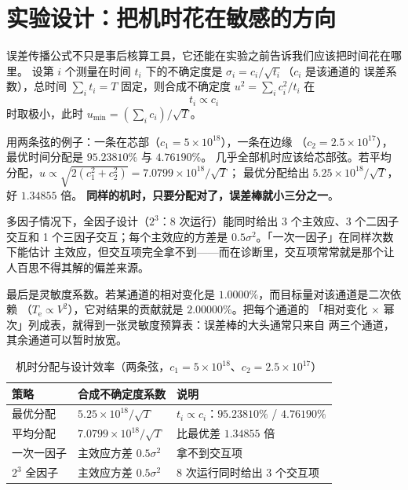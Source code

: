 \section{实验设计：把机时花在敏感的方向}
\label{sec:app-au-design}

误差传播公式不只是事后核算工具，它还能在实验之前告诉我们应该把时间花在哪里。
设第 $i$ 个测量在时间 $t_i$ 下的不确定度是 $\sigma_i=c_i/\sqrt{t_i}$（$c_i$ 是该通道的
误差系数），总时间 $\sum_i t_i=T$ 固定，则合成不确定度
$u^2=\sum_i c_i^2/t_i$ 在
\begin{equation}
t_i\propto c_i
\label{eq:app-au-alloc}
\end{equation}
时取极小，此时 $u_\mathrm{min}=(\sum_i c_i)/\sqrt{T}$。

用两条弦的例子：一条在芯部（$c_1=5\times10^{18}$），一条在边缘
（$c_2=2.5\times10^{17}$），最优时间分配是 $95.23810\%$ 与 $4.76190\%$。
几乎全部机时应该给芯部弦。若平均分配，$u\propto\sqrt{2(c_1^2+c_2^2)}=7.0799\times10^{18}/\sqrt{T}$；
最优分配给出 $5.25\times10^{18}/\sqrt{T}$，好 $1.34855$ 倍。
\textbf{同样的机时，只要分配对了，误差棒就小三分之一}。

多因子情况下，全因子设计（$2^3$：8 次运行）能同时给出 3 个主效应、3 个二因子交互和
1 个三因子交互；每个主效应的方差是 $0.5\sigma^2$。「一次一因子」在同样次数下能估计
主效应，但交互项完全拿不到——而在诊断里，交互项常常就是那个让人百思不得其解的偏差来源。

最后是灵敏度系数。若某通道的相对变化是 $1.0000\%$，而目标量对该通道是二次依赖
（$T_\mathrm{e}\propto V^2$），它对结果的贡献就是 $2.00000\%$。把每个通道的
「相对变化 $\times$ 幂次」列成表，就得到一张灵敏度预算表：误差棒的大头通常只来自
两三个通道，其余通道可以暂时放宽。

\begin{table}[htbp]
\centering
\small
\caption{机时分配与设计效率（两条弦，$c_1=5\times10^{18}$、$c_2=2.5\times10^{17}$）}
\label{tab:app-au-design}
\begin{tabular}{p{3.6cm}p{4.4cm}p{6.2cm}}
\hline
策略 & 合成不确定度系数 & 说明 \\
\hline
最优分配 & $5.25\times10^{18}/\sqrt{T}$ & $t_i\propto c_i$：$95.23810\%$ / $4.76190\%$ \\
平均分配 & $7.0799\times10^{18}/\sqrt{T}$ & 比最优差 $1.34855$ 倍 \\
一次一因子 & 主效应方差 $0.5\sigma^2$ & 拿不到交互项 \\
$2^3$ 全因子 & 主效应方差 $0.5\sigma^2$ & 8 次运行同时给出 3 个交互项 \\
\hline
\end{tabular}
\end{table}

